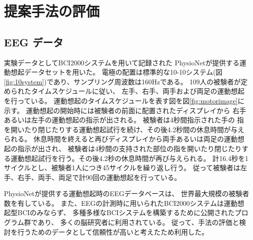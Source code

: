 \section{\mc 提案手法の評価}
\subsection{\rm EEG \mc データ}
実験データとしてBCI2000システム\cite{BCI2000}を用いて記録された
PhysioNet\cite{PhysioNet}が提供する運動想起データセットを用いた。
電極の配置は標準的な10-10システム(図\ref{fig:10system})であり、サンプリング周波数は160Hzである。
109人の被験者が定められたタイムスケジュールに従い、
左手、右手、両手および両足の運動想起を行っている。
運動想起のタイムスケジュールを表す図を図\ref{fig:motorimage}に示す。
運動想起の開始時には被験者の前面に配置されたディスプレイから
右手あるいは左手の運動想起の指示が出される。
被験者は4秒間指示された手の
指を開いたり閉じたりする運動想起試行を続け、その後4.2秒間の休息時間が与えられる。
休息時間を終えると再びディスプレイから両手あるいは両足の運動想起の指示が出され、
被験者は4秒間の支持された部位の指を開いたり閉じたりする運動想起試行を行う。その後4.2秒の休息時間が再び与えられる。
計16.4秒を1サイクルとし、被験者1人につき45サイクルを繰り返し行う。
従って被験者は左手、右手、両手、両足で計90回の運動想起を行っている。

PhysioNetが提供する運動想起時のEEGデータベースは、
世界最大規模の被験者数を有している。
また、EEGの計測時に用いられたBCI2000システムは運動想起型BCIのみならず、
多種多様なBCIシステムを構築するために公開されたプログラム群であり、
多くの脳研究者に利用されている。
従って、手法の評価と検討を行うためのデータとして信頼性が高いと考えたため利用した。

